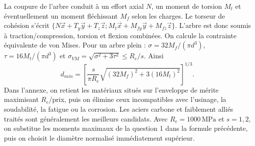 \begin{corrigebox}
La coupure de l'arbre conduit à un effort axial $N$, un moment de torsion
            $M_t$ et éventuellement un moment fléchissant $M_f$ selon les charges. Le
            torseur de cohésion s'écrit
            $\{N\vec x+T_y\vec y+T_z\vec z;M_t\vec x+M_{fy}\vec y+M_{fz}\vec z\}$.
            L'arbre est donc soumis à traction/compression, torsion et flexion combinées.
On calcule la contrainte équivalente de von Mises. Pour un arbre plein :
            $\sigma=32M_f/(\pi d^3)$, $\tau=16M_t/(\pi d^3)$ et
            $\sigma_{VM}=\sqrt{\sigma^2+3\tau^2}\le R_e/s$.
            Ainsi
            \[d_{min}=\left[\frac{s}{\pi R_e}
            \sqrt{(32M_f)^2+3(16M_t)^2}\right]^{1/3}.\]
Dans l'annexe, on retient les matériaux situés sur l'enveloppe de mérite
            maximisant $R_e$/prix, puis on élimine ceux incompatibles avec l'usinage, la
            soudabilité, la fatigue ou la corrosion. Les aciers carbone et faiblement
            alliés traités sont généralement les meilleurs candidats.
Avec $R_e=1000\,\mathrm{MPa}$ et $s=1,2$, on substitue les moments
            maximaux de la question 1 dans la formule précédente, puis on choisit le
            diamètre normalisé immédiatement supérieur.
\end{corrigebox}

